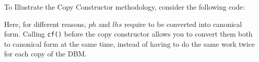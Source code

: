 \documentclass[11pt]{article}
\begin{document}
\begin{examppf}

To Illustrate the Copy Constructor methodology, consider the following code:

\parspc
\begin{algorithmic}[1]
\STATEtt{\ldots}
\ENDIF
\end{algorithmic}
\parspc

Here, for different reasons, $ph$ and $lhs$ require to be converted into canonical form.  Calling \texttt{cf()} before the copy constructor allows you to convert them both to canonical form at the same time, instead of having to do the same work twice for each copy of the DBM.

\end{examppf}
\end{document}
